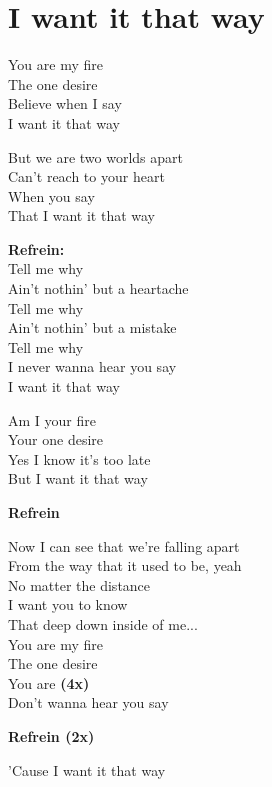 \section{I want it that way}
You are my fire\\
The one desire\\
Believe when I say\\
I want it that way

But we are two worlds apart\\
Can’t reach to your heart\\
When you say\\
That I want it that way

\textbf{Refrein:}\\
Tell me why\\
Ain’t nothin’ but a heartache\\
Tell me why\\
Ain’t nothin’ but a mistake\\
Tell me why\\
I never wanna hear you say\\
I want it that way

Am I your fire\\
Your one desire\\
Yes I know it’s too late\\
But I want it that way

\textbf{Refrein}

Now I can see that we’re falling apart\\
From the way that it used to be, yeah\\
No matter the distance\\
I want you to know\\
That deep down inside of me...\\
You are my fire\\
The one desire\\
You are \textbf{(4x)}\\
Don’t wanna hear you say

\textbf{Refrein (2x)}

’Cause I want it that way
